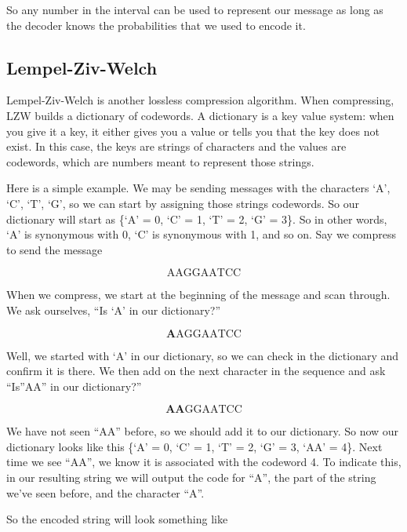 \documentclass[12pt,twoside]{reedthesis}
\begin{document}
So any number in the interval can be used to represent our message as long as the decoder knows the probabilities that we used to encode it.

\hypertarget{lempel-ziv-welch}{%
\subsection{Lempel-Ziv-Welch}\label{lempel-ziv-welch}}

Lempel-Ziv-Welch is another lossless compression algorithm. When compressing, LZW builds a dictionary of codewords. A dictionary is a key value system: when you give it a key, it either gives you a value or tells you that the key does not exist. In this case, the keys are strings of characters and the values are codewords, which are numbers meant to represent those strings.

Here is a simple example. We may be sending messages with the characters `A', `C', `T', `G', so we can start by assigning those strings codewords. So our dictionary will start as \{`A' = 0, `C' = 1, `T' = 2, `G' = 3\}. So in other words, `A' is synonymous with 0, `C' is synonymous with 1, and so on. Say we compress to send the message

\[\text{AAGGAATCC}\]

When we compress, we start at the beginning of the message and scan through. We ask ourselves, ``Is `A' in our dictionary?''

\[\textbf{A} \text{AGGAATCC}\]

Well, we started with `A' in our dictionary, so we can check in the dictionary and confirm it is there. We then add on the next character in the sequence and ask ``Is''AA'' in our dictionary?''

\[\textbf{AA} \text{GGAATCC}\]

We have not seen ``AA'' before, so we should add it to our dictionary. So now our dictionary looks like this \{`A' = 0, `C' = 1, `T' = 2, `G' = 3, `AA' = 4\}. Next time we see ``AA'', we know it is associated with the codeword 4. To indicate this, in our resulting string we will output the code for ``A'', the part of the string we've seen before, and the character ``A''.

So the encoded string will look something like
\end{document}
